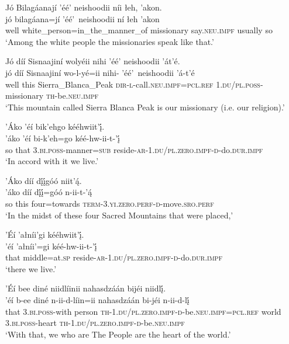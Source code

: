 \ea\label{ex:text4-11-3}
Jó Bilagáanají ’éé’ neishoodii níi łeh, ’akon.\\
\gll jó	bilagáana=jí	’éé’~{neishoodii}	ní	łeh	’akon\\
     well	white\_person=in\_the\_manner\_of	missionary	say.\textsc{neu}.\textsc{impf}	usually	so\\
\glt `Among the white people the missionaries speak like that.'
\z

\newpage
\ea\label{ex:text4-11-4}
Jó díí Sisnaajiní wolyéii nihi ’éé’ neishoodii ’át’é.\\
\gll jó	díí	Sisnaajiní	wo-l-yé=ii	nihi-	’éé’~{neishoodii}	’á-t’é\\
     well	this	Sierra\_Blanca\_Peak	\textsc{dir}-\textsc{l}-call.\textsc{neu}.\textsc{impf}=\textsc{pcl}.\textsc{ref}	1.\textsc{du}/\textsc{pl}.\textsc{poss}-	missionary	\textsc{th}-be.\textsc{neu}.\textsc{impf}\\
\glt `This mountain called Sierra Blanca Peak is our missionary (i.e. our religion).'
\z

\ea\label{ex:text4-11-5}
’Áko ’éí bik’ehgo kééhwiit’į́.\\
\gll ’áko	’éí	bi-k’eh=go	kéé-hw-ii-t-’į́\\
     so	that	3.\textsc{bi}.\textsc{poss}-manner=\textsc{sub}	reside-\textsc{ar}-1.\textsc{du}/\textsc{pl}.\textsc{zero}.\textsc{impf}-\textsc{d}-do.\textsc{dur}.\textsc{impf}\\
\glt `In accord with it we live.'
\z

\ea\label{ex:text4-11-6}
’Áko díí dį́į́góó niit’ą́.\\
\gll ’áko	díí	dį́į́=góó	n-ii-t-’ą́\\
     so	this	four=towards	\textsc{term}-3.\textsc{yi}.\textsc{zero}.\textsc{perf}-\textsc{d}-move.\textsc{sro}.\textsc{perf}\\
\glt `In the midst of these four Sacred Mountains that were placed,'
\z

\ea\label{ex:text4-11-7}
’Éí ’ałníi’gi kééhwiit’į́.\\
\gll ’éí	’ałníi’=gi	kéé-hw-ii-t-’į́\\
     that	middle=at.\textsc{sp}	reside-\textsc{ar}-1.\textsc{du}/\textsc{pl}.\textsc{zero}.\textsc{impf}-\textsc{d}-do.\textsc{dur}.\textsc{impf}\\
\glt `there we live.'
\z

\ea\label{ex:text4-11-8}
’Éí bee diné niidlíinii nahasdzáán bijéi niidlį́.\\
\gll ’éí	b-ee	diné	n-ii-d-líin=ii	nahasdzáán	bi-jéi	n-ii-d-lį́\\
     that	3.\textsc{bi}.\textsc{poss}-with	person	\textsc{th}-1.\textsc{du}/\textsc{pl}.\textsc{zero}.\textsc{impf}-\textsc{d}-be.\textsc{neu}.\textsc{impf}=\textsc{pcl}.\textsc{ref}	world	3.\textsc{bi}.\textsc{poss}-heart	\textsc{th}-1.\textsc{du}/\textsc{pl}.\textsc{zero}.\textsc{impf}-\textsc{d}-be.\textsc{neu}.\textsc{impf}\\
\glt `With that, we who are The People are the heart of the world.'
\z


